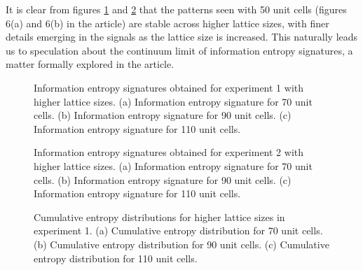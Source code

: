 \documentclass[10pt]{revtex4-1}
\newcommand\SSHOneEntropySignatureOneFourZero{./supp_ssh1_140_plot_feature_importances.png}
\newcommand\SSHOneEntropySignatureOneEightZero{./supp_ssh1_180_plot_feature_importances.png}
\newcommand\SSHOneEntropySignatureTwoTwoZero{./supp_ssh1_220_plot_feature_importances.png}
\newcommand\SSHTwoEntropySignatureOneFourZero{./supp_ssh2_140_plot_feature_importances.png}
\newcommand\SSHTwoEntropySignatureOneEightZero{./supp_ssh2_180_plot_feature_importances.png}
\newcommand\SSHTwoEntropySignatureTwoTwoZero{./supp_ssh2_220_plot_feature_importances.png}
\newcommand\SSHOneCumulativeEntropyOneFourZero{./supp_ssh1_140_plot_cumulative_feature_importances.png}
\newcommand\SSHOneCumulativeEntropyOneEightZero{./supp_ssh1_180_plot_cumulative_feature_importances.png}
\newcommand\SSHOneCumulativeEntropyTwoTwoZero{./supp_ssh1_220_plot_cumulative_feature_importances.png}
\begin{document}
It is clear from figures \ref{feature_importances_ssh1_longer_lattices} and \ref{feature_importances_ssh2_longer_lattices} that the patterns seen with 50 unit cells (figures 6(a) and 6(b) in the article) are stable across higher lattice sizes, with finer details emerging in the signals as the lattice size is increased. This naturally leads us to speculation about the continuum limit of information entropy signatures, a matter formally explored in the article.  

\begin{figure}
\centering
{}
\caption{Information entropy signatures obtained for experiment 1 with higher lattice sizes. (a) Information entropy signature for 70 unit cells. (b) Information entropy signature for 90 unit cells. (c) Information entropy signature for 110 unit cells.}
\label{feature_importances_ssh1_longer_lattices}
\end{figure}
\begin{figure}
\centering
{}
\caption{Information entropy signatures obtained for experiment 2 with higher lattice sizes. (a) Information entropy signature for 70 unit cells. (b) Information entropy signature for 90 unit cells. (c) Information entropy signature for 110 unit cells.}
\label{feature_importances_ssh2_longer_lattices}
\end{figure}

\pagebreak 

\begin{figure}
\centering
{}
\caption{Cumulative entropy distributions for higher lattice sizes in experiment 1. (a) Cumulative entropy distribution for 70 unit cells. (b) Cumulative entropy distribution for 90 unit cells. (c) Cumulative entropy distribution for 110 unit cells.}
\label{cdf1}
\end{figure}
\end{document}
